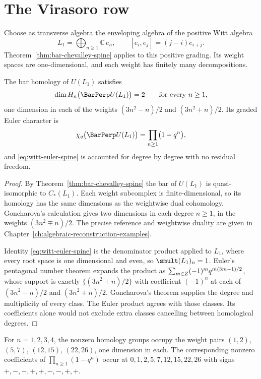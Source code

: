 \section{The Virasoro row}

Choose as transverse algebra the enveloping algebra of the positive Witt algebra
\[
 L_1=\bigoplus_{n\ge1}\mathbb C\,e_n,
 \qquad
 [e_i,e_j]=(j-i)e_{i+j}.
\]
Theorem~\ref{thm:bar-chevalley-spine} applies to this positive grading.
Its weight spaces are one-dimensional, and each weight has finitely many decompositions.

\begin{theorem}
\label{thm:pentagonal-spine}
The bar homology of $U(L_1)$ satisfies
\[
 \dim H_n\bigl(\BarPerp U(L_1)\bigr)=2
 \qquad\text{for every }n\ge1,
\]
one dimension in each of the weights $(3n^2-n)/2$ and $(3n^2+n)/2$. Its graded
Euler character is
\begin{equation}
\label{eq:witt-euler-spine}
 \chi_q\bigl(\BarPerp U(L_1)\bigr)=\prod_{n\ge1}\bigl(1-q^n\bigr),
\end{equation}
and \eqref{eq:witt-euler-spine} is accounted for degree by degree with no
residual freedom.
\end{theorem}
\begin{proof}
By Theorem~\ref{thm:bar-chevalley-spine} the bar of $U(L_1)$ is quasi-isomorphic to $C_*(L_1)$.
Each weight subcomplex is finite-dimensional, so its homology has the same
dimensions as the weightwise dual cohomology. Goncharova's calculation gives
two dimensions in each degree $n\ge1$, in the weights $(3n^2\mp n)/2$. The precise reference and weightwise duality are given in Chapter~\ref{ch:algebraic-reconstruction-examples}.

Identity \eqref{eq:witt-euler-spine} is the
denominator product applied to $L_1$, where every root space is one dimensional
and even, so $\smult(L_1)_n=1$. Euler's pentagonal number theorem expands the
product as $\sum_{m\in Z}(-1)^mq^{m(3m-1)/2}$, whose support is exactly
$\{(3n^2\pm n)/2\}$ with coefficient $(-1)^n$ at each of $(3n^2-n)/2$ and
$(3n^2+n)/2$. Goncharova's theorem supplies the degree and multiplicity of every class.
The Euler product agrees with those classes. Its coefficients alone would not exclude extra classes cancelling between homological degrees.
\end{proof}

For $n=1,2,3,4$, the nonzero homology groups occupy the weight pairs
$(1,2)$, $(5,7)$, $(12,15)$, $(22,26)$, one dimension in each.
The corresponding nonzero coefficients of $\prod_{n\ge1}(1-q^n)$ occur at
$0,1,2,5,7,12,15,22,26$ with signs $+,-,-,+,+,-,-,+,+$.

